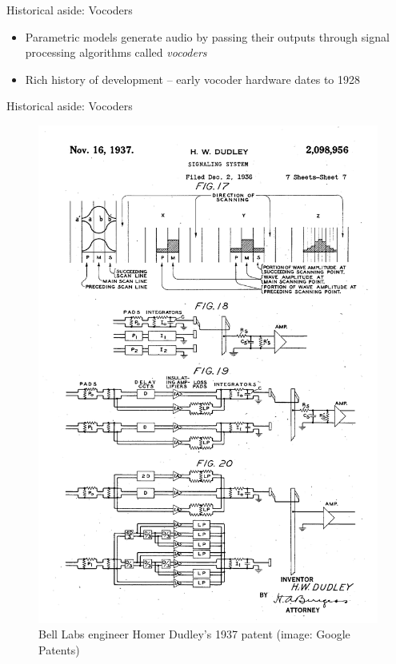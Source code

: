 \documentclass{beamer}
\begin{document}
\begin{frame}{Historical aside: Vocoders}

  \begin{itemize}
    \item Parametric models generate audio by passing their outputs through signal processing algorithms called \textit{vocoders}
    \item Rich history of development -- early vocoder hardware dates to 1928
  \end{itemize}
\end{frame}

\begin{frame}{Historical aside: Vocoders}
  \begin{figure}
    \includegraphics[height=0.8\textheight]{img/vocoder-patent.png}
    \caption{Bell Labs engineer Homer Dudley's 1937 patent (image: Google Patents)}
  \end{figure}
\end{frame}
\end{document}
